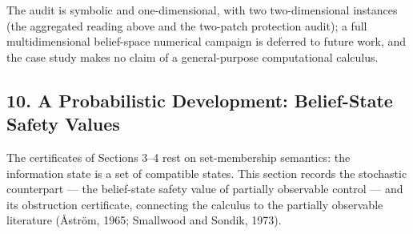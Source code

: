 \documentclass[10pt,twocolumn]{article}
\theoremstyle{definition}
\begin{document}
\begin{table}[t]
\centering
{}
\caption{The two-patch protection audit: aggregated beliefs under the reading
\(y = z_{1} + z_{2}\), audited against the exact belief-level recursion. Every
nonviable belief is certified by the common-action certificate
(Theorem~\ref{calc-thm:common-action}); the viable beliefs carry explicit blind
witness cycles.}
\label{calc-tab:patch}
\end{table}

The audit is symbolic and one-dimensional, with two two-dimensional instances
(the aggregated reading above and the two-patch protection audit); a full
multidimensional belief-space numerical campaign is deferred to future work,
and the case study makes no claim of a general-purpose computational calculus.

\subsection{10. A Probabilistic Development: Belief-State Safety Values}\label{calc-probabilistic-development}

The certificates of Sections 3--4 rest on set-membership semantics: the information state is a set of compatible states. This section records the stochastic counterpart --- the belief-state safety value of partially observable control --- and its obstruction certificate, connecting the calculus to the partially observable literature (\r{A}str\"om, 1965; Smallwood and Sondik, 1973).
\end{document}
